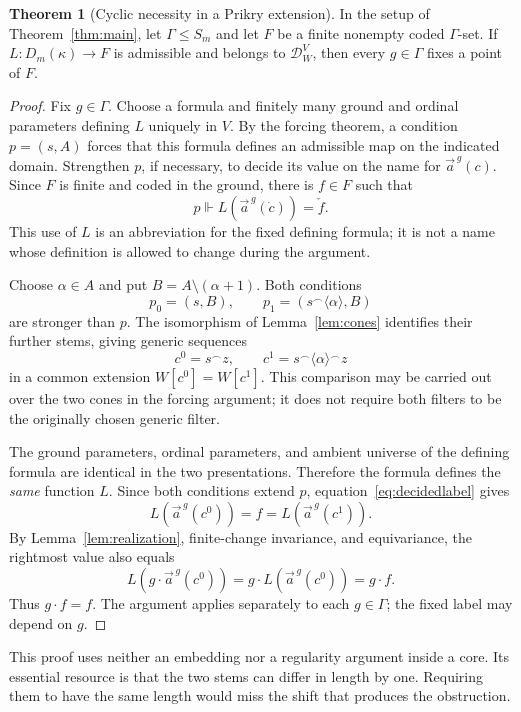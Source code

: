 \documentclass[11pt,letterpaper]{article}
\theoremstyle{definition}
\newtheorem{theorem}[definition]{Theorem}
\numberwithin{equation}{section}
\newcommand{\concat}{\mathbin{{}^\frown}}
\newcommand{\Dg}{\mathcal D_W^V}
\begin{document}
\begin{theorem}[Cyclic necessity in a Prikry extension]\label{thm:necessity}
In the setup of Theorem~\ref{thm:main}, let $\Gamma\le S_m$ and let $F$ be a finite nonempty coded $\Gamma$-set. If $L:D_m(\kappa)\to F$ is admissible and belongs to $\Dg$, then every $g\in\Gamma$ fixes a point of $F$.
\end{theorem}
\begin{proof}
Fix $g\in\Gamma$. Choose a formula and finitely many ground and ordinal parameters defining $L$ uniquely in $V$. By the forcing theorem, a condition $p=(s,A)$ forces that this formula defines an admissible map on the indicated domain. Strengthen $p$, if necessary, to decide its value on the name for $\vec a^{\,g}(c)$. Since $F$ is finite and coded in the ground, there is $f\in F$ such that
\begin{equation}\label{eq:decidedlabel}
p\Vdash L(\vec a^{\,g}(\dot c))=\check f.
\end{equation}
This use of $L$ is an abbreviation for the fixed defining formula; it is not a name whose definition is allowed to change during the argument.

Choose $\alpha\in A$ and put $B=A\setminus(\alpha+1)$. Both conditions
\[
p_0=(s,B),\qquad p_1=(s\concat\langle\alpha\rangle,B)
\]
are stronger than $p$. The isomorphism of Lemma~\ref{lem:cones} identifies their further stems, giving generic sequences
\[
c^0=s\concat z,\qquad c^1=s\concat\langle\alpha\rangle\concat z
\]
in a common extension $W[c^0]=W[c^1]$. This comparison may be carried out over the two cones in the forcing argument; it does not require both filters to be the originally chosen generic filter.

The ground parameters, ordinal parameters, and ambient universe of the defining formula are identical in the two presentations. Therefore the formula defines the \emph{same} function $L$. Since both conditions extend $p$, equation~\eqref{eq:decidedlabel} gives
\[
L(\vec a^{\,g}(c^0))=f=L(\vec a^{\,g}(c^1)).
\]
By Lemma~\ref{lem:realization}, finite-change invariance, and equivariance, the rightmost value also equals
\[
L(g\cdot\vec a^{\,g}(c^0))
   =g\cdot L(\vec a^{\,g}(c^0))=g\cdot f.
\]
Thus $g\cdot f=f$. The argument applies separately to each $g\in\Gamma$; the fixed label may depend on $g$.
\end{proof}

This proof uses neither an embedding nor a regularity argument inside a core. Its essential resource is that the two stems can differ in length by one. Requiring them to have the same length would miss the shift that produces the obstruction.
\end{document}
